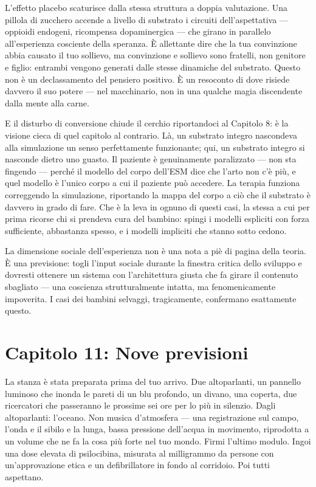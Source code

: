 \documentclass[11pt, twoside, openright]{book}
\begin{document}
L'effetto placebo scaturisce dalla stessa struttura a doppia valutazione. Una pillola di zucchero accende a livello di substrato i circuiti dell'aspettativa --- oppioidi endogeni, ricompensa dopaminergica --- che girano in parallelo all'esperienza cosciente della speranza. È allettante dire che la tua convinzione abbia causato il tuo sollievo, ma convinzione e sollievo sono fratelli, non genitore e figlio: entrambi vengono generati dalle stesse dinamiche del substrato. Questo non è un declassamento del pensiero positivo. È un resoconto di dove risiede davvero il suo potere --- nel macchinario, non in una qualche magia discendente dalla mente alla carne.

E il disturbo di conversione chiude il cerchio riportandoci al Capitolo 8: è la visione cieca di quel capitolo al contrario. Là, un substrato integro nascondeva alla simulazione un senso perfettamente funzionante; qui, un substrato integro si nasconde dietro uno guasto. Il paziente è genuinamente paralizzato --- non sta fingendo --- perché il modello del corpo dell'ESM dice che l'arto non c'è più, e quel modello è l'unico corpo a cui il paziente può accedere. La terapia funziona correggendo la simulazione, riportando la mappa del corpo a ciò che il substrato è davvero in grado di fare. Che è la leva in ognuno di questi casi, la stessa a cui per prima ricorse chi si prendeva cura del bambino: spingi i modelli espliciti con forza sufficiente, abbastanza spesso, e i modelli impliciti che stanno sotto cedono.

La dimensione sociale dell'esperienza non è una nota a piè di pagina della teoria. È una previsione: togli l'input sociale durante la finestra critica dello sviluppo e dovresti ottenere un sistema con l'architettura giusta che fa girare il contenuto sbagliato --- una coscienza strutturalmente intatta, ma fenomenicamente impoverita. I casi dei bambini selvaggi, tragicamente, confermano esattamente questo.


\chapter*{Capitolo 11: Nove previsioni}

La stanza è stata preparata prima del tuo arrivo. Due altoparlanti, un pannello luminoso che inonda le pareti di un blu profondo, un divano, una coperta, due ricercatori che passeranno le prossime sei ore per lo più in silenzio. Dagli altoparlanti: l'oceano. Non musica d'atmosfera --- una registrazione sul campo, l'onda e il sibilo e la lunga, bassa pressione dell'acqua in movimento, riprodotta a un volume che ne fa la cosa più forte nel tuo mondo. Firmi l'ultimo modulo. Ingoi una dose elevata di psilocibina, misurata al milligrammo da persone con un'approvazione etica e un defibrillatore in fondo al corridoio. Poi tutti aspettano.
\end{document}
